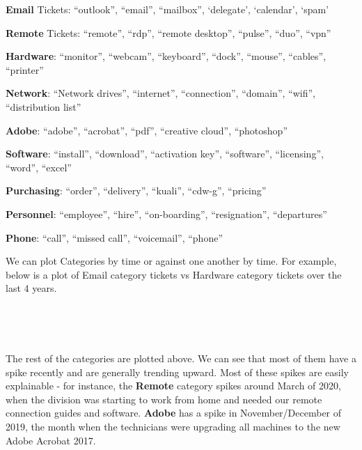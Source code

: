 \documentclass[11pt]{article}
\begin{document}
    \textbf{Email} Tickets: ``outlook'', ``email'', ``mailbox'', `delegate',
`calendar', `spam'

\textbf{Remote} Tickets: ``remote'', ``rdp'', ``remote desktop'',
``pulse'', ``duo'', ``vpn''

\textbf{Hardware}: ``monitor'', ``webcam'', ``keyboard'', ``dock'',
``mouse'', ``cables'', ``printer''

\textbf{Network}: ``Network drives'', ``internet'', ``connection'',
``domain'', ``wifi'', ``distribution list''

\textbf{Adobe}: ``adobe'', ``acrobat'', ``pdf'', ``creative cloud'',
``photoshop''

\textbf{Software}: ``install'', ``download'', ``activation key'',
``software'', ``licensing'', ``word'', ``excel''

\textbf{Purchasing}: ``order'', ``delivery'', ``kuali'', ``cdw-g'',
``pricing''

\textbf{Personnel}: ``employee'', ``hire'', ``on-boarding'',
``resignation'', ``departures''

\textbf{Phone}: ``call'', ``missed call'', ``voicemail'', ``phone''

We can plot Categories by time or against one
another by time. For example, below is a plot of Email category tickets
vs Hardware category tickets over the last 4 years.

    \begin{center}
    \end{center}
    { \hspace*{\fill} \\}
    
    \begin{center}
    \end{center}
    { \hspace*{\fill} \\}
    
    The rest of the categories are plotted above. We can see that most of
them have a spike recently and are generally trending upward. Most of
these spikes are easily explainable - for instance, the \textbf{Remote}
category spikes around March of 2020, when the division was starting to
work from home and needed our remote connection guides and software.
\textbf{Adobe} has a spike in November/December of 2019, the month when
the technicians were upgrading all machines to the new Adobe Acrobat
2017.
\end{document}
